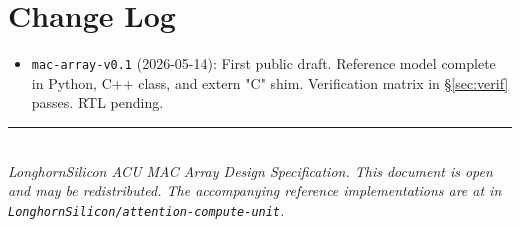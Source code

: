 \documentclass[11pt]{article}
\begin{document}
\section{Change Log}
\label{sec:changelog}

\begin{itemize}
\item \texttt{mac-array-v0.1} (2026-05-14): First public draft.
      Reference model complete in Python, C++ class, and extern "C"
      shim. Verification matrix in \S\ref{sec:verif} passes. RTL
      pending.
\end{itemize}

\vspace{0.5in}
\noindent\rule{\textwidth}{0.4pt}\\
\noindent\small\textit{LonghornSilicon ACU MAC Array Design Specification.
This document is open and may be redistributed. The accompanying
reference implementations are at
 in
\texttt{LonghornSilicon/attention-compute-unit}.}
\end{document}
